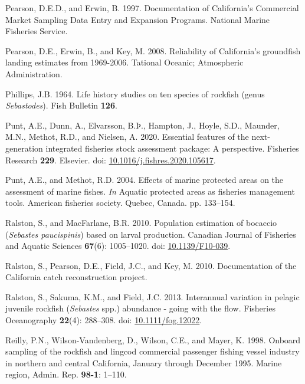 \documentclass[11pt,
  english,
]{article}
\newlength{\cslhangindent}
\newenvironment{CSLReferences}[2] %
 {%
  \setlength{\parindent}{0pt}
  \ifodd #1 \everypar{\setlength{\hangindent}{\cslhangindent}}\ignorespaces\fi
  \ifnum #2 > 0
  \setlength{\parskip}{#2\baselineskip}
  \fi
 }%
 {}
\begin{document}
\begin{CSLReferences}{1}{0}
\leavevmode{}%
Pearson, D.E.D., and Erwin, B. 1997. {Documentation of California's Commercial Market Sampling Data Entry and Expansion Programs}. National Marine Fisheries Service.

\leavevmode{}%
Pearson, D.E., Erwin, B., and Key, M. 2008. {Reliability of California's groundfish landing estimates from 1969-2006}. Tational Oceanic; Atmospheric Administration.

\leavevmode{}%
Phillips, J.B. 1964. {Life history studies on ten species of rockfish (genus \emph{Sebastodes})}. Fish Bulletin \textbf{126}.

\leavevmode{}%
Punt, A.E., Dunn, A., Elvarsson, B.Þ., Hampton, J., Hoyle, S.D., Maunder, M.N., Methot, R.D., and Nielsen, A. 2020. {Essential features of the next-generation integrated fisheries stock assessment package: A perspective}. Fisheries Research \textbf{229}. Elsevier. doi: \href{https://doi.org/10.1016/j.fishres.2020.105617}{10.1016/j.fishres.2020.105617}.

\leavevmode{}%
Punt, A.E., and Methot, R.D. 2004. {Effects of marine protected areas on the assessment of marine fishes}. \emph{In} Aquatic protected areas as fisheries management tools. American fisheries society. Quebec, Canada. pp. 133--154.

\leavevmode{}%
Ralston, S., and MacFarlane, B.R. 2010. {Population estimation of bocaccio (\emph{Sebastes paucispinis}) based on larval production}. Canadian Journal of Fisheries and Aquatic Sciences \textbf{67}(6): 1005--1020. doi: \href{https://doi.org/10.1139/F10-039}{10.1139/F10-039}.

\leavevmode{}%
Ralston, S., Pearson, D.E., Field, J.C., and Key, M. 2010. {Documentation of the California catch reconstruction project}.

\leavevmode{}%
Ralston, S., Sakuma, K.M., and Field, J.C. 2013. {Interannual variation in pelagic juvenile rockfish (\emph{Sebastes} spp.) abundance - going with the flow}. Fisheries Oceanography \textbf{22}(4): 288--308. doi: \href{https://doi.org/10.1111/fog.12022}{10.1111/fog.12022}.

\leavevmode{}%
Reilly, P.N., Wilson-Vandenberg, D., Wilson, C.E., and Mayer, K. 1998. {Onboard sampling of the rockfish and lingcod commercial passenger fishing vessel industry in northern and central California, January through December 1995.} Marine region, Admin. Rep. \textbf{98-1}: 1--110.


\end{CSLReferences}
\end{document}

